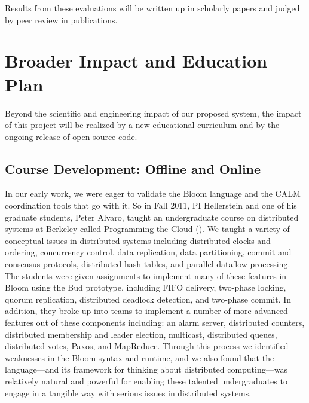 Results from these evaluations will be written up in scholarly papers and judged by peer review in publications.

\section{Broader Impact and Education Plan}

Beyond the scientific and engineering impact of our proposed system,
the impact of this project will be realized by a new educational
curriculum and by the ongoing release of open-source code.  


\subsection{Course Development: Offline and Online}

In our early work, we were eager to validate the Bloom language and the CALM coordination tools that go with it.  So in Fall 2011, PI Hellerstein and one of his graduate students, Peter Alvaro, taught an undergraduate course on distributed systems at Berkeley called Programming the Cloud ().  We taught a variety of conceptual issues in distributed systems including distributed clocks and ordering, concurrency control, data replication, data partitioning, commit and consensus protocols, distributed hash tables, and parallel dataflow processing.  The students were given assignments to implement many of these features in Bloom using the Bud prototype, including FIFO delivery, two-phase locking, quorum replication,  distributed deadlock detection, and two-phase commit.  In addition, they broke up into teams to implement a number of more advanced features out of these components including: an alarm server, distributed counters, distributed membership and leader election, multicast, distributed queues, distributed votes, Paxos, and MapReduce.  Through this process we identified weaknesses in the Bloom syntax and runtime, and we also found that the language---and its framework for thinking about distributed computing---was relatively natural and powerful for enabling these talented undergraduates to engage in a tangible way with serious issues in distributed systems.


